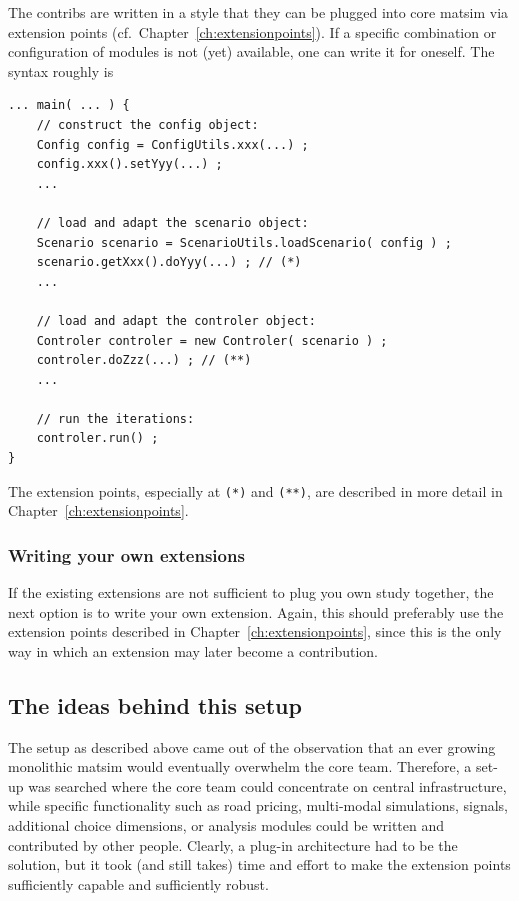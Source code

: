 The contribs are written in a style that they can be plugged into core \acrshort{matsim} via extension points (cf.\ Chapter~\ref{ch:extensionpoints}).  If a specific combination or configuration of modules is not (yet) available, one can write it for oneself.  The syntax roughly is
\begin{lstlisting}
... main( ... ) {
    // construct the config object:
    Config config = ConfigUtils.xxx(...) ;
    config.xxx().setYyy(...) ;
    ...

    // load and adapt the scenario object:
    Scenario scenario = ScenarioUtils.loadScenario( config ) ;
    scenario.getXxx().doYyy(...) ; // (*)
    ...

    // load and adapt the controler object:
    Controler controler = new Controler( scenario ) ;
    controler.doZzz(...) ; // (**)
    ...

    // run the iterations:
    controler.run() ;
}
\end{lstlisting}
The extension points, especially at \lstinline{(*)} and \lstinline{(**)}, are described in more detail in Chapter~\ref{ch:extensionpoints}.

\subsubsection{Writing your own extensions}
\label{sec:writing-your-own-extensions}

If the existing extensions are not sufficient to plug you own study together, the next option is to write your own extension.  Again, this should preferably use the extension points described in Chapter~\ref{ch:extensionpoints}, since this is the only way in which an \gls{extension} may later become a \gls{contribution}.  




\subsection{The ideas behind this setup}

The setup as described above came out of the observation that an ever growing monolithic \acrshort{matsim} would eventually overwhelm the core team.  Therefore, a set-up was searched where the core team could concentrate on central infrastructure, while specific functionality such as road pricing, multi-modal simulations, signals, additional choice dimensions, or analysis modules could be written and contributed by other people.  Clearly, a plug-in architecture had to be the solution, but it took (and still takes) time and effort to make the extension points sufficiently capable and sufficiently robust.  

